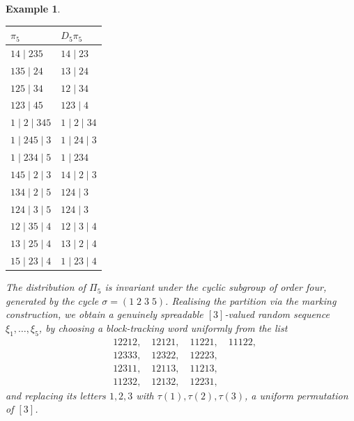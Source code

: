 \documentclass{article}
\newtheorem{example}{Example}
\begin{document}
\begin{example}
{\begin{minipage}[t]{0.31\textwidth}
\end{minipage}
\hfill
\begin{minipage}[t]{0.31\textwidth}
\centering
\begin{tabular}{l | l}
$\pi_5$ & $D_5\pi_5$ \\
\hline
$14 \mid 235$ & $14 \mid 23$ \\
$135 \mid 24$ & $13 \mid 24$ \\
$125 \mid 34$ & $12 \mid 34$ \\
$123 \mid 45$ & $123 \mid 4$ \\
$1 \mid 2 \mid 345$ & $1 \mid 2 \mid 34$ \\
$1 \mid 245 \mid 3$ & $1 \mid 24 \mid 3$ \\
$1 \mid 234 \mid 5$ & $1 \mid 234$ \\
$145 \mid 2 \mid 3$ & $14 \mid 2 \mid 3$ \\
$134 \mid 2 \mid 5$ & $124 \mid 3$ \\
$124 \mid 3 \mid 5$ & $124 \mid 3$ \\
$12 \mid 35 \mid 4$ & $12 \mid 3 \mid 4$ \\
$13 \mid 25 \mid 4$ & $13 \mid 2 \mid 4$ \\
$15 \mid 23 \mid 4$ & $1 \mid 23 \mid 4$
\end{tabular}
\end{minipage}
\vskip0.2cm

The distribution of $\Pi_5$ 
is invariant under the cyclic subgroup of order four,  generated by the cycle $\sigma = (1 \; 2 \; 3 \; 5)$.
Realising the partition via the marking construction, we obtain a genuinely spreadable $[3]$-valued
random sequence $\xi_1, \ldots, \xi_5$, by choosing a block-tracking word uniformly from the list
\vskip0.1cm
\begin{equation*}
\begin{aligned}
&12212, \quad 12121, \quad 11221, \quad 11122, \\
&12333, \quad 12322, \quad 12223, \\
&12311, \quad 12113, \quad 11213, \\
&11232, \quad 12132, \quad 12231,
\end{aligned}
\end{equation*}
and replacing its letters $1,2,3$ with $\tau(1),\tau(2),\tau(3)$, a uniform permutation of $[3]$.
}
\end{example}
\vskip0.2cm
\end{document}
